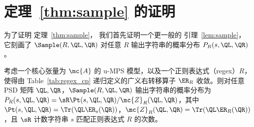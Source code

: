\section{定理~\ref{thm:sample} 的证明}
\label{sec:appendix_b}

为了证明 定理~\ref{thm:sample}，
我们首先证明一个更一般的 引理~\ref{lem:sample}，它刻画了 $\Sample(R, \QL, \QR)$ 对任意 $R$ 输出字符串的概率分布 $P_R(s, \QL, \QR)$。
%
\begin{lemma}
\label{lem:sample}
考虑一个核心张量为 $\mc{A}$ 的 u-MPS 模型，以及一个正则表达式（regex）$R$，使得由 Table~\ref{tab:regex_cp} 递归定义的广义右转移算子 $\ER_R$
收敛。则对任意 PSD 矩阵 $\QL, \QR$，$\Sample(R, \QL, \QR)$ 输出字符串的概率分布为 $P_R(s, \QL, \QR) = \sR \Pt(s, \QL, \QR) / \mc{Z}_R(\QL, \QR)$，其中 $\Pt(s, \QL, \QR) = \Tr(\QL \ER_s(\QR))$，$\mc{Z}_R(\QL, \QR) = \Tr(\QL \ER_R(\QR))$，且 $\sR$ 计数字符串 $s$ 匹配正则表达式 $R$ 的次数。
\end{lemma}

